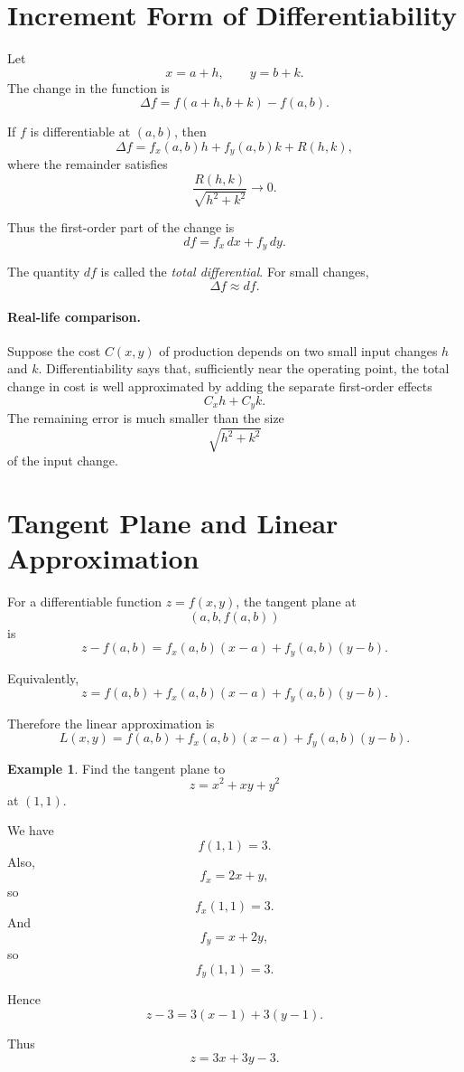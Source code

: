 \documentclass[11pt,oneside]{book}
\theoremstyle{studentthm}
\theoremstyle{definition}
\newtheorem{example}[theorem]{Example}
\begin{document}
\section{Increment Form of Differentiability}

Let
\[
x=a+h,\qquad y=b+k.
\]
The change in the function is
\[
\Delta f
=
f(a+h,b+k)-f(a,b).
\]

If \(f\) is differentiable at \((a,b)\), then
\[
\Delta f
=
f_x(a,b)h
+
f_y(a,b)k
+
R(h,k),
\]
where the remainder satisfies
\[
\frac{R(h,k)}{\sqrt{h^2+k^2}}
\to0.
\]

Thus the first-order part of the change is
\[
df
=
f_x\,dx+f_y\,dy.
\]

The quantity \(df\) is called the \emph{total differential}. For small
changes,
\[
\Delta f\approx df.
\]

\paragraph{Real-life comparison.}
Suppose the cost \(C(x,y)\) of production depends on two small input
changes \(h\) and \(k\). Differentiability says that, sufficiently near
the operating point, the total change in cost is well approximated by
adding the separate first-order effects
\[
C_xh+C_yk.
\]
The remaining error is much smaller than the size
\[
\sqrt{h^2+k^2}
\]
of the input change.

\section{Tangent Plane and Linear Approximation}

For a differentiable function \(z=f(x,y)\), the tangent plane at
\[
(a,b,f(a,b))
\]
is
\[
z-f(a,b)
=
f_x(a,b)(x-a)
+
f_y(a,b)(y-b).
\]

Equivalently,
\[
z
=
f(a,b)
+
f_x(a,b)(x-a)
+
f_y(a,b)(y-b).
\]

Therefore the linear approximation is
\[
L(x,y)
=
f(a,b)
+
f_x(a,b)(x-a)
+
f_y(a,b)(y-b).
\]

\begin{example}
Find the tangent plane to
\[
z=x^2+xy+y^2
\]
at \((1,1)\).

We have
\[
f(1,1)=3.
\]
Also,
\[
f_x=2x+y,
\]
so
\[
f_x(1,1)=3.
\]
And
\[
f_y=x+2y,
\]
so
\[
f_y(1,1)=3.
\]

Hence
\[
z-3
=
3(x-1)+3(y-1).
\]

Thus
\[
z=3x+3y-3.
\]
\end{example}
\end{document}
